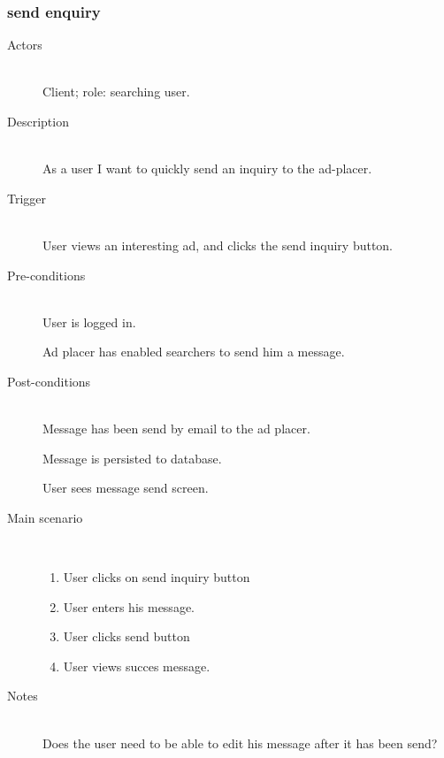 \documentclass[a4wide]{article}
\begin{document}
\subsubsection{send enquiry}
\begin{description}
\item[Actors]\mbox{}\\
Client; role: searching user.
\item[Description]\mbox{}\\
As a user I want to quickly send an inquiry to the ad-placer.
\item[Trigger]\mbox{}\\
User views an interesting ad, and clicks the send inquiry button.
\item[Pre-conditions]\mbox{}\\
User is logged in.

Ad placer has enabled searchers to send him a message.
\item[Post-conditions]\mbox{}\\
Message has been send by email to the ad placer.

Message is persisted to database.

User sees message send screen.
\item[Main scenario]\mbox{}\\
\begin{enumerate}
\item User clicks on send inquiry button
\item User enters his message.
\item User clicks send button
\item User views succes message.
\end{enumerate}
\item[Notes]\mbox{}\\
Does the user need to be able to edit his message after it has been send?
\end{description}
\end{document}

